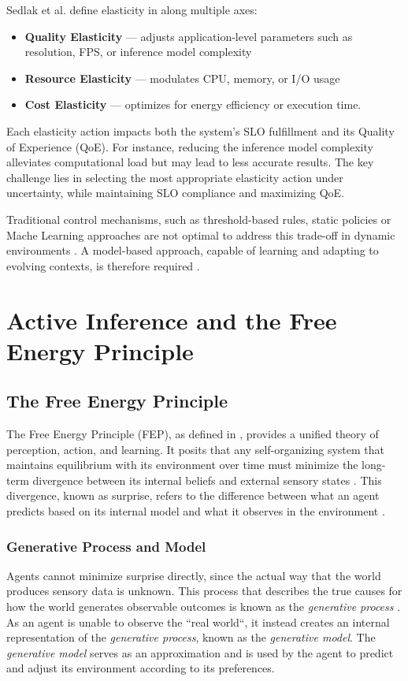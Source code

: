 Sedlak et al. define elasticity in \cite{sedlak_towards_2025} along multiple axes:
\begin{itemize}
  \item \textbf{Quality Elasticity} — adjusts application-level parameters such as resolution, FPS,
or inference model complexity
  \item \textbf{Resource Elasticity} — modulates CPU, memory, or I/O usage
  \item \textbf{Cost Elasticity} — optimizes for energy efficiency or execution time.
\end{itemize}

Each elasticity action impacts both the system's SLO fulfillment and its Quality of Experience
(QoE). For instance, reducing the inference model complexity alleviates computational load but may lead to less accurate results. The key challenge lies in selecting the most appropriate elasticity action under uncertainty, while maintaining SLO compliance and maximizing QoE.

Traditional control mechanisms, such as threshold-based rules, static policies or Mache Learning approaches are not optimal to address this trade-off in dynamic environments \cite{sedlak_active_2024}. A model-based approach, capable of learning and adapting to evolving contexts, is therefore required \cite{sedlak_equilibrium_2024, danilenka_adaptive_2025}.

\section{Active Inference and the Free Energy Principle}
\subsection{The Free Energy Principle}
The Free Energy Principle (FEP), as defined in \cite{friston_free-energy_2010}, provides a unified
theory of perception, action, and learning. It posits that any self-organizing system that
maintains equilibrium with its environment over time must minimize the long-term divergence between its
internal beliefs and external sensory states \cite{friston_active_2017}. This divergence, known as
surprise, refers to the difference between what an agent predicts based on its internal model and what it observes in the environment \cite{sedlak_adaptive_2024}.

\subsubsection{Generative Process and Model}
Agents cannot minimize surprise directly, since the actual way that the world produces sensory data
is unknown. This process that describes the true causes for how the world generates observable
outcomes is known as the \textit{generative process} \cite{friston_free-energy_2010, smith_step-by-step_2022}. As an agent is unable to observe the ``real world``, it instead creates an internal representation of the \textit{generative process}, known as the \textit{generative model}. The \textit{generative model} serves as an approximation and is used by the agent to predict and adjust its environment according to its preferences.

